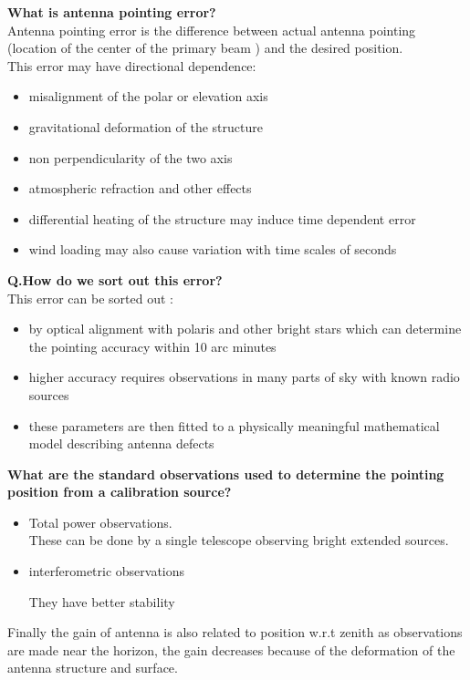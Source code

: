 \documentclass[10pt]{report}
\newcommand{\tbf}[1]{\textbf{#1}}
\begin{document}
\tbf{What is antenna pointing error?}\\
Antenna pointing error is the difference between actual antenna pointing (location of the center of the primary beam ) and the desired position.\\

This error may have directional dependence:
\begin{itemize}
\item misalignment of the polar or elevation axis
\item gravitational deformation of the structure
\item non perpendicularity of the two axis
\item atmospheric refraction and other effects
\item differential heating of the structure may induce time dependent error
\item wind loading may also cause variation with time scales of seconds
\end{itemize}

\textbf{Q.How do we sort out this error?}\\
This error can be sorted out :
\begin{itemize}
\item by optical alignment with polaris and other bright stars which can determine the pointing accuracy within 10 arc minutes
\item higher accuracy requires observations in many parts of sky with known radio sources
\item these parameters are then fitted to a physically meaningful mathematical model describing antenna defects
\end{itemize}

\tbf{What are the standard observations used to determine the pointing position from a calibration source?}\\
\begin{itemize}
\item Total power observations.\\

These can be done by a single telescope observing bright extended sources.
\item interferometric observations

They have better stability
\end{itemize}

Finally the gain of antenna is also related to position w.r.t zenith as observations are made near the horizon, the gain decreases because of the deformation of the antenna structure and surface.\\
\end{document}
